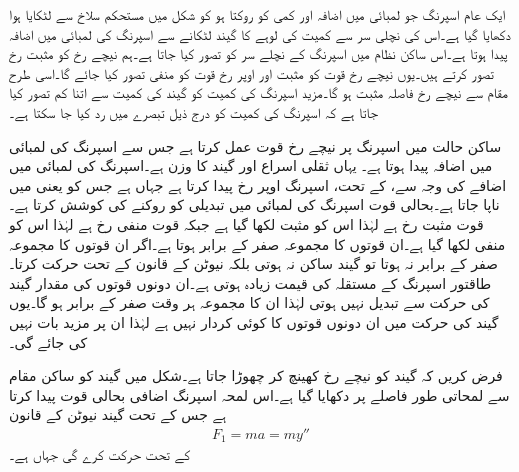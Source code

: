 ایک عام اسپرنگ جو لمبائی میں اضافہ اور کمی کو روکتا ہو کو شکل  میں مستحکم سلاخ سے لٹکایا ہوا دکھایا گیا ہے۔اس کی نچلی سر سے کمیت  کی لوہے کا گیند لٹکانے سے  اسپرنگ کی لمبائی میں   اضافہ پیدا ہوتا ہے۔اس ساکن نظام میں اسپرنگ کے نچلے سر کو  تصور کیا جاتا ہے۔ہم نیچے رخ کو مثبت رخ تصور کرتے ہیں۔یوں نیچے رخ  قوت کو مثبت اور اوپر رخ  قوت کو منفی تصور کیا جائے گا۔اسی طرح مقام  سے نیچے رخ  فاصلہ  مثبت ہو گا۔مزید اسپرنگ کی کمیت کو گیند کی کمیت سے اتنا کم تصور کیا جاتا ہے کہ اسپرنگ کی کمیت کو درج ذیل تبصرے میں رد کیا جا سکتا ہے۔

ساکن حالت میں اسپرنگ پر نیچے رخ قوت  عمل کرتا ہے جس سے  اسپرنگ  کی لمبائی میں  اضافہ پیدا ہوتا ہے۔ یہاں  ثقلی اسراع اور  گیند کا وزن ہے۔اسپرنگ کی لمبائی میں اضافے  کی وجہ سے،  کے تحت، اسپرنگ اوپر رخ     پیدا کرتا ہے جہاں   ہے جس کو  یعنی  میں ناپا جاتا ہے۔بحالی قوت اسپرنگ کی لمبائی میں تبدیلی کو روکنے کی کوشش کرتا ہے۔قوت  مثبت رخ ہے لہٰذا اس کو مثبت لکھا گیا ہے جبکہ قوت  منفی رخ ہے لہٰذا اس کو منفی لکھا گیا ہے۔ان قوتوں کا مجموعہ صفر  کے برابر ہوتا ہے۔اگر ان قوتوں کا مجموعہ صفر کے برابر نہ ہوتا تو گیند ساکن نہ ہوتی بلکہ نیوٹن کے قانون  کے تحت حرکت کرتا۔طاقتور اسپرنگ کے مستقلہ  کی قیمت زیادہ ہوتی ہے۔ان دونوں قوتوں کی مقدار گیند کی حرکت سے تبدیل نہیں ہوتی لہٰذا ان کا مجموعہ ہر وقت صفر کے برابر ہو گا۔یوں گیند کی حرکت میں ان دونوں قوتوں کا کوئی کردار نہیں ہے لہٰذا ان پر مزید بات نہیں کی جائے گی۔

فرض کریں کہ گیند کو نیچے رخ کھینچ کر چھوڑا جاتا ہے۔شکل  میں گیند کو ساکن مقام سے لمحاتی طور  فاصلے پر دکھایا گیا ہے۔اس لمحہ اسپرنگ اضافی بحالی قوت  پیدا کرتا ہے جس کے تحت گیند نیوٹن کے قانون
\begin{align}
F_1=ma = my''
\end{align}
 کے تحت حرکت کرے گی جہاں  ہے۔

